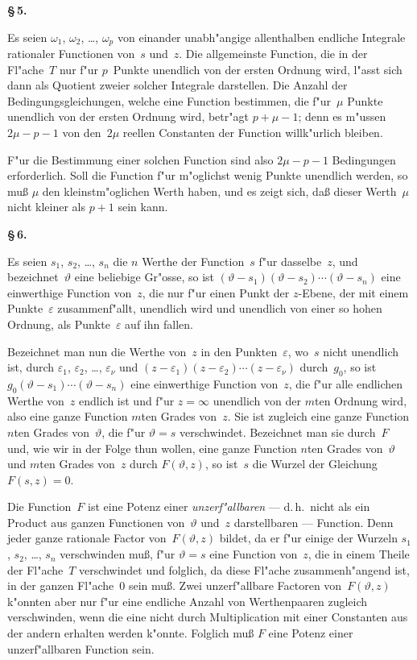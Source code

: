 \documentclass[12pt,a4paper]{book}
\theoremstyle{definition}
\theoremstyle{remark}
\begin{document}
\medskip
\textbf{\S\,5.}

Es seien $\omega_1$, $\omega_2$, \ldots, $\omega_p$ von einander unabh"angige allenthalben
endliche Integrale rationaler Functionen von~$s$ und~$z$. Die allgemeinste
Function, die in der Fl"ache~$T$ nur f"ur $p$~Punkte unendlich von der
ersten Ordnung wird, l"asst sich dann als Quotient zweier solcher
Integrale darstellen. Die Anzahl der Bedingungsgleichungen, welche
eine Function bestimmen, die f"ur~$\mu$ Punkte unendlich von der ersten
Ordnung wird, betr"agt $p + \mu - 1$; denn es m"ussen $2\mu - p - 1$
von den~$2\mu$ reellen Constanten der Function willk"urlich bleiben.

F"ur die Bestimmung einer solchen Function sind also $2\mu - p - 1$
Bedingungen erforderlich. Soll die Function f"ur m"oglichst wenig Punkte
unendlich werden, so mu\ss{} $\mu$ den kleinstm"oglichen Werth haben, und
es zeigt sich, da\ss{} dieser Werth~$\mu$ nicht kleiner als $p + 1$ sein kann.

\medskip
\textbf{\S\,6.}

Es seien $s_1$, $s_2$, \ldots, $s_n$ die $n$ Werthe der Function~$s$ f"ur dasselbe~$z$,
und bezeichnet~$\vartheta$ eine beliebige Gr"osse, so ist
$(\vartheta - s_1)(\vartheta - s_2)\cdots(\vartheta - s_n)$ eine einwerthige Function von~$z$,
die nur f"ur einen Punkt der $z$-Ebene, der mit einem Punkte~$\varepsilon$
zusammenf"allt, unendlich wird und unendlich von einer so hohen
Ordnung, als Punkte~$\varepsilon$ auf ihn fallen.

Bezeichnet man nun die Werthe von~$z$ in den Punkten~$\varepsilon$, wo~$s$ nicht
unendlich ist, durch $\varepsilon_1$, $\varepsilon_2$, \ldots, $\varepsilon_\nu$ und
$(z - \varepsilon_1)(z - \varepsilon_2)\cdots(z - \varepsilon_\nu)$ durch~$g_0$, so ist
$g_0(\vartheta - s_1)\cdots(\vartheta - s_n)$ eine einwerthige Function von~$z$, die
f"ur alle endlichen Werthe von~$z$ endlich ist und f"ur $z = \infty$ unendlich
von der $m$ten Ordnung wird, also eine ganze Function $m$ten Grades
von~$z$. Sie ist zugleich eine ganze Function $n$ten Grades von~$\vartheta$,
die f"ur $\vartheta = s$ verschwindet. Bezeichnet man sie durch~$F$ und, wie
wir in der Folge thun wollen, eine ganze Function $n$ten Grades von~$\vartheta$
und $m$ten Grades von~$z$ durch $F(\vartheta, z)$, so ist~$s$ die Wurzel der
Gleichung $F(s,z) = 0$.

Die Function~$F$ ist eine Potenz einer \emph{unzerf"allbaren} --- d.\,h.\ nicht
als ein Product aus ganzen Functionen von~$\vartheta$ und~$z$ darstellbaren ---
Function. Denn jeder ganze rationale Factor von~$F(\vartheta,z)$ bildet, da er
f"ur einige der Wurzeln $s_1$, $s_2$, \ldots, $s_n$ verschwinden mu\ss{}, f"ur
$\vartheta = s$ eine Function von~$z$, die in einem Theile der Fl"ache~$T$
verschwindet und folglich, da diese Fl"ache zusammenh"angend ist, in
der ganzen Fl"ache~$0$ sein mu\ss{}. Zwei unzerf"allbare Factoren
von~$F(\vartheta,z)$ k"onnten aber nur f"ur eine endliche Anzahl von Werthenpaaren
zugleich verschwinden, wenn die eine nicht durch Multiplication mit einer
Constanten aus der andern erhalten werden k"onnte. Folglich mu\ss{} $F$
eine Potenz einer unzerf"allbaren Function sein.
\end{document}
